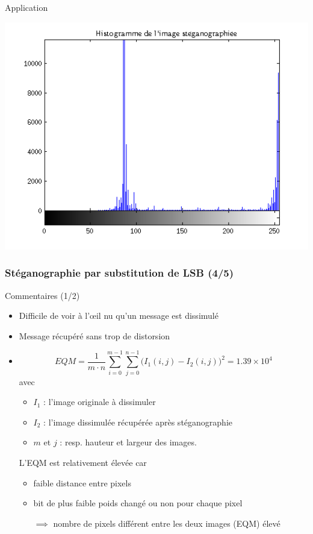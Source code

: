 \documentclass{beamer}
\begin{document}
\begin{frame}
\begin{exampleblock}{Application}
\begin{minipage}{.32\textwidth}
		\includegraphics[scale=0.18]{images/fig6.png}
		{\centering{}}
		\label{fig6}
	\end{minipage}
	\end{exampleblock}
	\end{frame}
	
	\begin{frame}
	\frametitle{Stéganographie par substitution de LSB (4/5)}
	\begin{block}{Commentaires (1/2)}
   	\rightskip=0pt\leftskip=0pt
	\begin{itemize}
	 	\item Difficile de voir à l'\oe il nu qu'un message est dissimulé
	 	\item Message récupéré sans trop de distorsion
	 	\item $$ EQM = \frac{1}{m\cdot n}\sum_{i=0}^{m-1}\sum_{j=0}^{n-1}\big(I_1(i,j)-I_2(i,j) \big)^2 = 1.39\times 10^4$$
	 		avec \begin{itemize}
	 				\item $I_1$ : l'image originale à dissimuler
	 				\item $I_2$ : l'image dissimulée récupérée après stéganographie
	 				\item $m$ et $j$ : resp. hauteur et largeur des images.
	 			\end{itemize}
	 		L'EQM est relativement élevée car 
	 			\begin{itemize}
	 				\item faible distance entre pixels
	 				\item bit de plus faible poids changé ou non pour chaque pixel
	 				\item[$\implies$] nombre de pixels différent entre les deux images (EQM) élevé
	 			\end{itemize}
	\end{itemize}
	\end{block}
	\end{frame}
	
\end{document}

